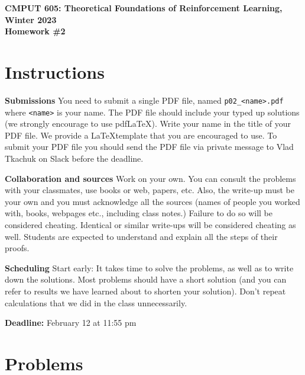 \documentclass{article}
\newcommand{\hwnumber}{2}
\DeclareMathOperator*{\1}{\mathbbm{1}}
\newcommand{\0}{\mathbf{0}}
\theoremstyle{definition}
\theoremstyle{remark}
\begin{document}
\begin{center}
{\Large \textbf{CMPUT 605: Theoretical Foundations of Reinforcement Learning, Winter 2023\\ Homework \#\hwnumber}}
\end{center}

\section*{Instructions}
\textbf{Submissions}
You need to submit a single PDF file, named {\tt p0\hwnumber\_<name>.pdf} where {\tt <name>} is your name.
The PDF file should include your typed up solutions (we strongly encourage to use pdf\LaTeX). 
Write your name in the title of your PDF file.
We provide a \LaTeX template that you are encouraged to use.
To submit your PDF file you should send the PDF file via private message to Vlad Tkachuk on Slack before the deadline.

\textbf{Collaboration and sources}
Work on your own. You can consult the problems with your classmates, use books
or web, papers, etc.
Also, the write-up must be your own and you must acknowledge all the
sources (names of people you worked with, books, webpages etc., including class notes.) 
Failure to do so will be considered cheating.  
Identical or similar write-ups will be considered cheating as well.
Students are expected to understand and explain all the steps of their proofs.

\textbf{Scheduling}
Start early: It takes time to solve the problems, as well as to write down the solutions. Most problems should have a short solution (and you can refer to results we have learned about to shorten your solution). Don't repeat calculations that we did in the class unnecessarily.

\vspace{0.3cm}

\textbf{Deadline:} February 12 at 11:55 pm

\newcommand{\cM}{\mathcal{M}}
\newcommand{\nS}{\mathrm{S}}
\newcommand{\nA}{\mathrm{A}}
\newcommand{\PP}{\mathbb{P}}
\newcommand{\RR}{\mathbb{R}}
\newcommand{\ip}[1]{\langle #1 \rangle}

\section*{Problems}
\end{document}
